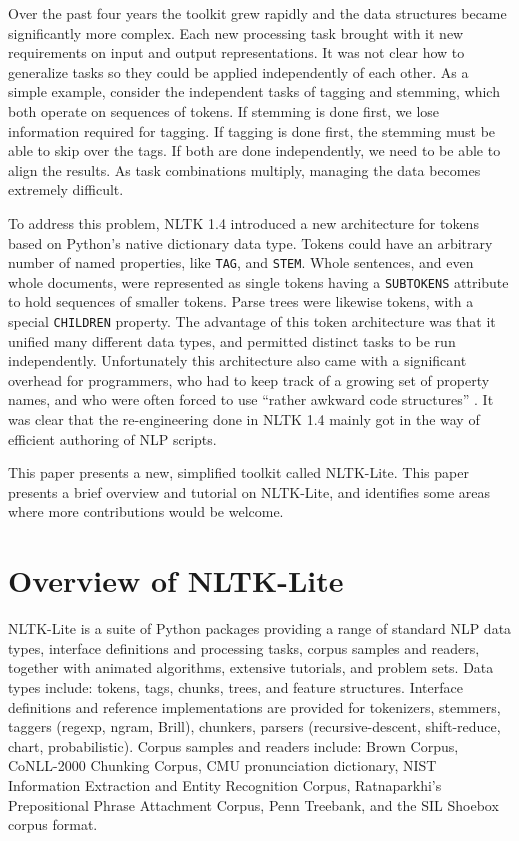 \documentclass[11pt]{article}
\begin{document}
Over the past four years the toolkit grew rapidly and the data
structures became significantly more complex.  Each new processing
task brought with it new requirements on input and output
representations.  It was not clear how to generalize tasks so they
could be applied independently of each other.  As a simple example,
consider the independent tasks of tagging and stemming, which both
operate on sequences of tokens.  If stemming is done first, we lose
information required for tagging.  If tagging is done first, the
stemming must be able to skip over the tags.  If both are done independently,
we need to be able to align the results.  As task combinations multiply,
managing the data becomes extremely difficult.

To address this problem, NLTK 1.4 introduced a new architecture for
tokens based on Python's native dictionary data type.  Tokens could have
an arbitrary number of named properties, like \texttt{TAG}, and \texttt{STEM}.
Whole sentences, and even whole documents, were represented as single tokens
having a \texttt{SUBTOKENS} attribute to hold sequences of smaller tokens.
Parse trees were likewise tokens, with a special \texttt{CHILDREN} property.
The advantage of this token architecture was that it unified many different
data types, and permitted distinct tasks to be run independently.
Unfortunately this architecture also came with a significant overhead for
programmers, who had to keep track of a growing set of property names,
and who were often forced to use ``rather awkward code structures'' \cite{Hearst05}.
It was clear that the re-engineering done in NLTK 1.4 mainly got in the way of
efficient authoring of NLP scripts.

This paper presents a new, simplified toolkit called NLTK-Lite.  This paper
presents a brief overview and tutorial on NLTK-Lite, and identifies
some areas where more contributions would be welcome.

\section{Overview of NLTK-Lite}

NLTK-Lite is a suite of Python packages providing a range of standard
NLP data types, interface definitions and processing tasks, corpus
samples and readers, together with animated algorithms, extensive
tutorials, and problem sets.  Data types include: tokens, tags,
chunks, trees, and feature structures.  Interface definitions and
reference implementations are provided for tokenizers, stemmers,
taggers (regexp, ngram, Brill), chunkers, parsers (recursive-descent,
shift-reduce, chart, probabilistic).  Corpus samples and readers
include: Brown Corpus, CoNLL-2000 Chunking Corpus, CMU pronunciation
dictionary, NIST Information Extraction and Entity Recognition Corpus,
Ratnaparkhi's Prepositional Phrase Attachment Corpus, Penn Treebank,
and the SIL Shoebox corpus format.
\end{document}
